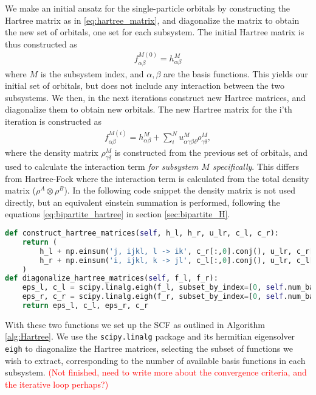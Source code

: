 \documentclass{subfiles}
\begin{document}
We make an initial ansatz for the single-particle orbitals by constructing the Hartree matrix as in \eqref{eq:hartree_matrix}, and diagonalize the matrix to obtain the new set of orbitals, one set for each subsystem. The initial Hartree matrix is thus constructed as
\begin{align*}
    f_{\alpha\beta}^{M(0)} = h_{\alpha\beta}^M
\end{align*}
where $M$ is the subsystem index, and $\alpha, \beta$ are the basis functions. This yields our initial set of orbitals, but does not include any interaction between the two subsystems. We then, in the next iterations construct new Hartree matrices, and diagonalize them to obtain new orbitals. The new Hartree matrix for the i'th iteration is constructed as
\begin{align*}
    f_{\alpha\beta}^{M(i)} = h_{\alpha\beta}^M + \sum_{i}^{N} u_{\alpha\gamma\beta\delta}^{M} \rho_{\gamma\delta}^{M},
\end{align*}
where the density matrix $\rho_{\gamma\delta}^{M}$ is constructed from the previous set of orbitals, and used to calculate the interaction term \emph{for subsystem $M$ specifically}. This differs from Hartree-Fock where the interaction term is calculated from the total density matrix ($\rho^A\otimes\rho^B$). In the following code snippet the density matrix is not used directly, but an equivalent einstein summation is performed, following the equations \eqref{eq:bipartite_hartree} in section \ref{sec:bipartite_H}.
\begin{lstlisting}[language=Python]
def construct_hartree_matrices(self, h_l, h_r, u_lr, c_l, c_r):
    return (
        h_l + np.einsum('j, ijkl, l -> ik', c_r[:,0].conj(), u_lr, c_r[:,0]),
        h_r + np.einsum('i, ijkl, k -> jl', c_l[:,0].conj(), u_lr, c_l[:,0]),
    )
def diagonalize_hartree_matrices(self, f_l, f_r):
    eps_l, c_l = scipy.linalg.eigh(f_l, subset_by_index=[0, self.num_basis_l - 1])
    eps_r, c_r = scipy.linalg.eigh(f_r, subset_by_index=[0, self.num_basis_r - 1])
    return eps_l, c_l, eps_r, c_r
\end{lstlisting}
With these two functions we set up the SCF as outlined in Algorithm \ref{alg:Hartree}. We use the \texttt{scipy.linalg}\cite{2020SciPy-NMeth} package and its hermitian eigensolver \texttt{eigh} to diagonalize the Hartree matrices, selecting the subset of functions we wish to extract, corresponding to the number of available basis functions in each subsystem. \textcolor{red}{(Not finished, need to write more about the convergence criteria, and the iterative loop perhaps?)}
\end{document}
